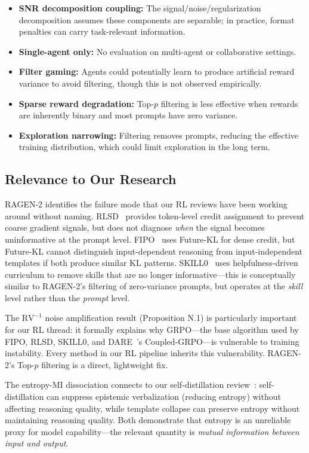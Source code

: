 \documentclass[11pt]{article}
\begin{document}
\begin{itemize}
    \item \textbf{SNR decomposition coupling:} The signal/noise/regularization decomposition assumes these components are separable; in practice, format penalties can carry task-relevant information.
    \item \textbf{Single-agent only:} No evaluation on multi-agent or collaborative settings.
    \item \textbf{Filter gaming:} Agents could potentially learn to produce artificial reward variance to avoid filtering, though this is not observed empirically.
    \item \textbf{Sparse reward degradation:} Top-$p$ filtering is less effective when rewards are inherently binary and most prompts have zero variance.
    \item \textbf{Exploration narrowing:} Filtering removes prompts, reducing the effective training distribution, which could limit exploration in the long term.
\end{itemize}

\subsection{Relevance to Our Research}

RAGEN-2 identifies the failure mode that our RL reviews have been working around without naming. RLSD~\cite{rlsd} provides token-level credit assignment to prevent coarse gradient signals, but does not diagnose \textit{when} the signal becomes uninformative at the prompt level. FIPO~\cite{fipo} uses Future-KL for dense credit, but Future-KL cannot distinguish input-dependent reasoning from input-independent templates if both produce similar KL patterns. SKILL0~\cite{skill0} uses helpfulness-driven curriculum to remove skills that are no longer informative---this is conceptually similar to RAGEN-2's filtering of zero-variance prompts, but operates at the \textit{skill} level rather than the \textit{prompt} level.

The $\mathrm{RV}^{-1}$ noise amplification result (Proposition N.1) is particularly important for our RL thread: it formally explains why GRPO---the base algorithm used by FIPO, RLSD, SKILL0, and DARE~\cite{dare}'s Coupled-GRPO---is vulnerable to training instability. Every method in our RL pipeline inherits this vulnerability. RAGEN-2's Top-$p$ filtering is a direct, lightweight fix.

The entropy-MI dissociation connects to our self-distillation review~\cite{selfdistill}: self-distillation can suppress epistemic verbalization (reducing entropy) without affecting reasoning quality, while template collapse can preserve entropy without maintaining reasoning quality. Both demonstrate that entropy is an unreliable proxy for model capability---the relevant quantity is \textit{mutual information between input and output}.
\end{document}

